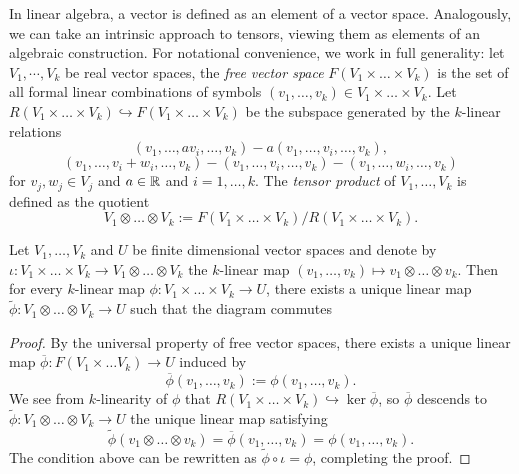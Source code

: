 In linear algebra, a vector is defined as an element of a vector space. Analogously, we can take an intrinsic approach to tensors, viewing them as elements of an algebraic construction. For notational convenience, we work in full generality: let $V_1, \cdots, V_k$ be real vector spaces, the \emph{free vector space} $F(V_1 \times \dots \times V_k)$ is the set of all formal linear combinations of symbols $(v_1, \dots, v_k) \in V_1 \times \dots \times V_k$. Let $R(V_1 \times \dots \times V_k) \hookrightarrow F(V_1 \times \dots \times V_k)$ be the subspace generated by the $k$-linear relations
	\[		(v_1, \dots, av_i, \dots, v_k) - a(v_1, \dots, v_i, \dots, v_k), \]
	\[	
		(v_1, \dots, v_i + w_i, \dots, v_k) - (v_1, \dots, v_i, \dots, v_k) - (v_1, \dots, w_i, \dots, v_k)
	\]
for $v_j, w_j \in V_j$ and $a \in \mathbb R$ and $i = 1, \dots, k$. The \emph{tensor product} of $V_1, \dots, V_k$ is defined as the quotient 
	\[ V_1 \otimes \dots \otimes V_k := F(V_1 \times \dots \times V_k) / R(V_1 \times \dots \times V_k).\]


\begin{lemma}
	Let $V_1, \dots, V_k$ and $U$ be finite dimensional vector spaces and denote by $\iota : V_1 \times \dots \times V_k \to V_1 \otimes \dots \otimes V_k$ the $k$-linear map $(v_1, \dots, v_k) \mapsto v_1 \otimes \dots \otimes v_k$. Then for every $k$-linear map $\phi : V_1 \times \dots \times V_k \to U$, there exists a unique linear map $\widetilde \phi :  V_1 \otimes \dots \otimes V_k  \to U$ such that the diagram commutes
	\begin{center}
	\end{center}
\end{lemma}

\begin{proof}
	By the universal property of free vector spaces, there exists a unique linear map $\overline \phi : F(V_1 \times \dots V_k) \to U$ induced by 
		\[ \overline \phi (v_1, \dots, v_k) := \phi(v_1, \dots, v_k).  \]
	We see from $k$-linearity of $\phi$ that $R(V_1 \times \dots \times V_k) \hookrightarrow \ker \overline \phi$, so $\overline \phi$ descends to $\widetilde \phi : V_1 \otimes \dots \otimes V_k \to U$ the unique linear map satisfying 
		\[ \widetilde \phi (v_1 \otimes \dots \otimes v_k) = \overline \phi (v_1, \dots, v_k) = \phi(v_1, \dots, v_k). \]
	The condition above can be rewritten as $\widetilde \phi \circ \iota = \phi$, completing the proof. 
\end{proof}

